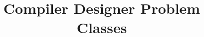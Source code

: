 \documentclass[a4paper, answers]{exam}
\title{Compiler Designer Problem Classes}
\author{}
\begin{document}
    \maketitle
    \begin{questions}
%       
%       
        
    \end{questions}
\end{document}
